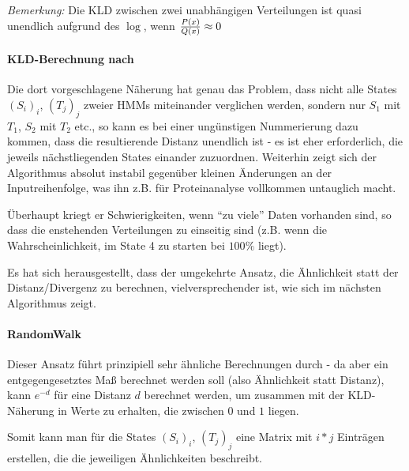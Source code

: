 \documentclass{DEarticle}
\begin{document}
\emph{Bemerkung:} Die KLD zwischen zwei unabhängigen Verteilungen ist quasi unendlich aufgrund des $\log$, wenn ${P(x)
\over Q(x)} \approx 0 $

\paragraph {KLD-Berechnung nach \cite{comp}}
Die dort vorgeschlagene Näherung hat genau das Problem, dass nicht alle States $(S_i)_i$, $(T_j)_j$ zweier HMMs miteinander
verglichen werden, sondern nur $S_1$ mit $T_1$, $S_2$ mit $T_2$ etc., so kann es bei einer ungünstigen Nummerierung dazu
kommen, dass die resultierende Distanz unendlich ist - es ist eher erforderlich, die jeweils nächstliegenden States
einander zuzuordnen. 
Weiterhin zeigt sich der Algorithmus absolut instabil gegenüber kleinen Änderungen an der Inputreihenfolge, was ihn z.B.
für Proteinanalyse vollkommen untauglich macht. 

Überhaupt kriegt er Schwierigkeiten, wenn ``zu viele'' Daten vorhanden
sind, so dass die enstehenden Verteilungen zu einseitig sind (z.B. wenn die Wahrscheinlichkeit, im State 4 zu starten
bei $100\%$ liegt).

Es hat sich herausgestellt, dass der umgekehrte Ansatz, die Ähnlichkeit statt der Distanz/Divergenz
zu berechnen, vielversprechender ist, wie sich im nächsten Algorithmus zeigt.

\paragraph {RandomWalk \cite{randomwalk}}
\label{newmethod}
Dieser Ansatz führt prinzipiell sehr ähnliche Berechnungen durch - da aber ein entgegengesetztes Maß berechnet werden
soll (also Ähnlichkeit statt Distanz), kann $e^{-d}$ für eine Distanz $d$ berechnet werden, um zusammen
mit der KLD-Näherung in \cite{unscented} Werte zu erhalten, die zwischen $0$ und $1$ liegen.

Somit kann man für die States $(S_i)_i$, $(T_j)_j$  eine Matrix mit $i * j$ Einträgen erstellen, die die jeweiligen
Ähnlichkeiten beschreibt.
\end{document}
